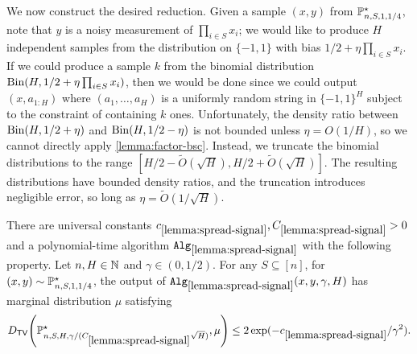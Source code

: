 We now construct the desired reduction. Given a sample $(x,y)$ from $\mathbb{P}^\star_{n,S,1,1/4}$, note that $y$ is a noisy measurement of $\prod_{i \in S} x_i$; we would like to produce $H$ independent samples from the distribution on $\{-1,1\}$ with bias $1/2 + \eta\prod_{i \in S} x_i$. If we could produce a sample $k$ from the binomial distribution $\operatorname{Bin}(H, 1/2 + \eta\prod_{i \in S} x_i)$, then we would be done since we could output $(x, a_{1:H})$ where $(a_1,\dots,a_H)$ is a uniformly random string in $\{-1,1\}^H$ subject to the constraint of containing $k$ ones. Unfortunately, the density ratio between $\operatorname{Bin}(H, 1/2 + \eta)$ and $\operatorname{Bin}(H, 1/2 - \eta)$ is not bounded unless $\eta = O(1/H)$, so we cannot directly apply \cref{lemma:factor-bsc}. Instead, we truncate the binomial distributions to the range $[H/2 - \tilde{O}(\sqrt{H}), H/2 + \tilde{O}(\sqrt{H})]$. The resulting distributions have bounded density ratios, and the truncation introduces negligible error, so long as $\eta = \tilde{O}(1/\sqrt{H})$.

\begin{lemma}\label{lemma:spread-signal}
There are universal constants $c_{\ref{lemma:spread-signal}}, C_{\ref{lemma:spread-signal}} > 0$ and a polynomial-time algorithm $\texttt{Alg}_{\ref{lemma:spread-signal}}$ with the following property. Let $n,H \in \mathbb{N}$ and $\gamma \in (0,1/2)$. For any $S \subseteq [n]$, for $(x,y) \sim \mathbb{P}^\star_{n,S,1,1/4}$, the output of $\texttt{Alg}_{\ref{lemma:spread-signal}}(x,y,\gamma,H)$ has marginal distribution $\mu$ satisfying \[\Dtv{\BP^\st_{n,S,H,\gamma/(C_{\ref{lemma:spread-signal}}\sqrt{H})}}{\mu} \leq 2\exp(-c_{\ref{lemma:spread-signal}}/\gamma^2).\]
\end{lemma}

